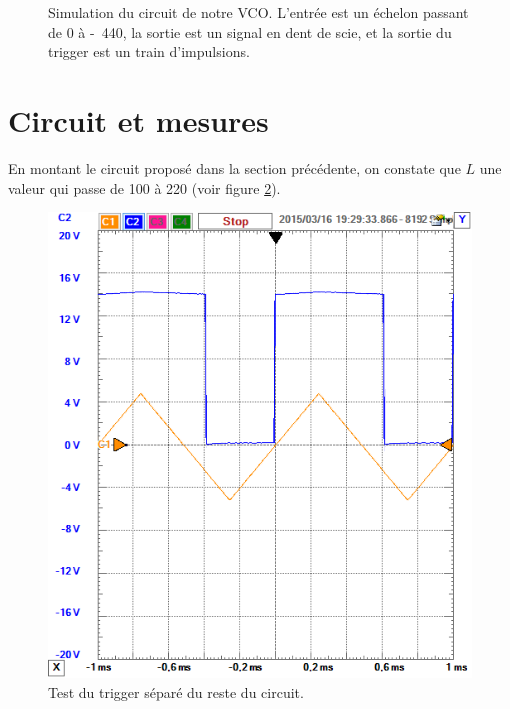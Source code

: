 \begin{figure}[ht]
	\centering
	\caption{Simulation du circuit de notre VCO. L'entrée est un échelon
	passant de \unit{0}{\volt} à \unit{-440}{\milli\volt}, la sortie
	est un signal en dent de scie, et la sortie du trigger est un train
	d'impulsions.}
	\label{fig:simulation}
\end{figure}

\newpage

\section{Circuit et mesures}
En montant le circuit proposé dans la section précédente, on
constate que $L$ une valeur qui passe de \unit{100}{\milli\volt} à \unit{220}{\milli\volt} (voir figure \ref{fig:trigger-L}).

\begin{figure}[ht]
	\centering
	\includegraphics[scale=0.7]{img/trigger-L.png}
	\caption{Test du trigger séparé du reste du circuit.}
	\label{fig:trigger-L}
\end{figure}

